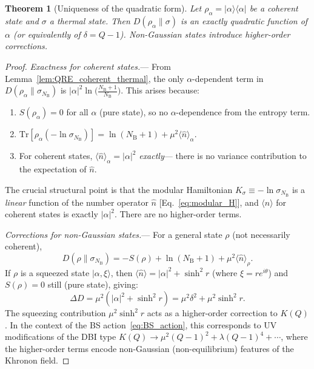 \documentclass[letterpaper,twocolumn,superscriptaddress,longbibliography]{revtex4-2}
\newtheorem{theorem}{Theorem}[section]
\newcommand{\Tr}{\mathrm{Tr}}
\newcommand{\ket}[1]{|#1\rangle}
\newcommand{\bra}[1]{\langle#1|}
\newcommand{\nhat}{\hat{n}}
\newcommand{\NB}{N_{\mathrm{B}}}
\begin{document}
\begin{theorem}[Uniqueness of the quadratic form]
\label{thm:uniqueness}
Let $\rho_\alpha = \ket{\alpha}\!\bra{\alpha}$ be a coherent state
and $\sigma$ a thermal state.
Then $D(\rho_\alpha\|\sigma)$ is an exactly quadratic function of
$\alpha$ (or equivalently of $\delta = Q - 1$).
Non-Gaussian states introduce higher-order corrections.
\end{theorem}

\begin{proof}
\emph{Exactness for coherent states.}---
From Lemma~\ref{lem:QRE_coherent_thermal}, the only
$\alpha$-dependent term in $D(\rho_\alpha\|\sigma_{\NB})$
is $|\alpha|^2 \ln\bigl(\frac{\NB+1}{\NB}\bigr)$.
This arises because:
\begin{enumerate}
  \item $S(\rho_\alpha) = 0$ for all $\alpha$ (pure state),
        so no $\alpha$-dependence from the entropy term.
  \item $\Tr[\rho_\alpha(-\ln\sigma_{\NB})]
        = \ln(\NB+1) + \mu^2 \langle\nhat\rangle_\alpha$.
  \item For coherent states,
        $\langle\nhat\rangle_\alpha = |\alpha|^2$ \emph{exactly}---
        there is no variance contribution to the expectation
        of $\nhat$.
\end{enumerate}
The crucial structural point is that the modular Hamiltonian
$K_\sigma \equiv -\ln\sigma_{\NB}$ is a \emph{linear} function of
the number operator $\nhat$
[Eq.~\eqref{eq:modular_H}], and $\langle\nhat\rangle$
for coherent states is exactly $|\alpha|^2$.
There are no higher-order terms.

\emph{Corrections for non-Gaussian states.}---
For a general state $\rho$ (not necessarily coherent),
\begin{equation}
  D(\rho\|\sigma_{\NB})
  = -S(\rho) + \ln(\NB+1) + \mu^2 \langle\nhat\rangle_\rho.
  \label{eq:D_general}
\end{equation}
If $\rho$ is a squeezed state $\ket{\alpha,\xi}$, then
$\langle\nhat\rangle = |\alpha|^2 + \sinh^2 r$ (where
$\xi = r e^{i\theta}$) and $S(\rho) = 0$ still (pure state),
giving:
\begin{equation}
  \Delta D
  = \mu^2(|\alpha|^2 + \sinh^2 r)
  = \mu^2\delta^2 + \mu^2\sinh^2 r.
  \label{eq:D_squeezed}
\end{equation}
The squeezing contribution $\mu^2\sinh^2 r$ acts as a
higher-order correction to $K(Q)$.
In the context of the BS action~\eqref{eq:BS_action}, this
corresponds to UV modifications of the DBI type
$K(Q) \to \mu^2(Q-1)^2 + \lambda(Q-1)^4 + \cdots$,
where the higher-order terms encode non-Gaussian
(non-equilibrium) features of the Khronon field.
\end{proof}
\end{document}
